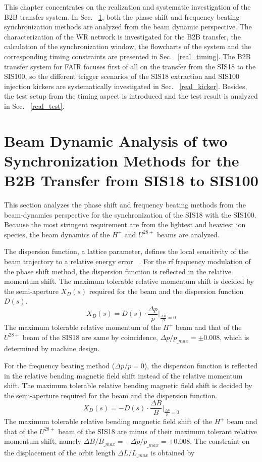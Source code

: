 

This chapter concentrates on the realization and systematic investigation of the \gls{B2B} transfer system. In Sec. ~\ref{real_dyn}, both the phase shift and frequency beating synchronization methods are analyzed from the beam dynamic perspective. The characterization of the WR network is investigated for the B2B transfer, the calculation of the synchronization window, the flowcharts of the system and the corresponding timing constraints are presented in Sec. ~\ref{real_timing}. The B2B transfer system for FAIR focuses first of all on the transfer from the SIS18 to the SIS100, so the different trigger scenarios of the SIS18 extraction and SIS100 injection kickers are systematically investigated in Sec. ~\ref{real_kicker}. Besides, the test setup from the timing aspect is introduced and the test result is analyzed in Sec. ~\ref{real_test}. 

\section{Beam Dynamic Analysis of two Synchronization Methods for the B2B Transfer from SIS18 to SIS100}
\label{real_dyn}
This section analyzes the phase shift and frequency beating methods from the beam-dynamics perspective for the synchronization of the SIS18 with the SIS100. Because the most stringent requirement are from the lightest and heaviest ion species, the beam dynamics of the $H^+$ and $U^\mathit{28+}$ beams are analyzed.

The dispersion function, a lattice parameter, defines the local sensitivity of the beam trajectory to a relative energy error ~\cite{lee_accelerator_2011}. For the rf frequency modulation of the phase shift method, the dispersion function is reflected in the relative momentum shift. The maximum tolerable relative momentum shift is decided by the semi-aperture $X_D(s)$ required for the beam and the dispersion function $D(s)$.
\begin{equation}
		X_D(s)=D(s)\cdot \frac{\Delta p}{p}|_\mathit{\frac{\Delta B}{B}=0}
\end{equation}
The maximum tolerable relative momentum of the $H^{+}$ beam and that of the $U^\mathit{28+}$ beam of the SIS18 are same by coincidence, $\Delta p/p_\mathit{\_max}=\pm0.008$, which is determined by machine design. 

For the frequency beating method ($\Delta p/p=0$), the dispersion function is reflected in the relative bending magnetic field shift instead of the relative momentum shift. The maximum tolerable relative bending magnetic field shift is decided by the semi-aperture required for the beam and the dispersion function. 
\begin{equation}
		X_D(s)=-D(s)\cdot \frac{\Delta B}{B}|_\mathit{\frac{\Delta p}{p}=0}
\end{equation}
The maximum tolerable relative bending magnetic field shift of the $H^{+}$ beam and that of the $U^\mathit{28+}$ beam of the SIS18 are minus of their maximum tolerant relative momentum shift, namely $\Delta B/B_\mathit{\_max}=-\Delta p/p_\mathit{\_max}=\pm0.008$. The constraint on the displacement of the orbit length $\Delta L/L_\mathit{\_max}$ is obtained by 

